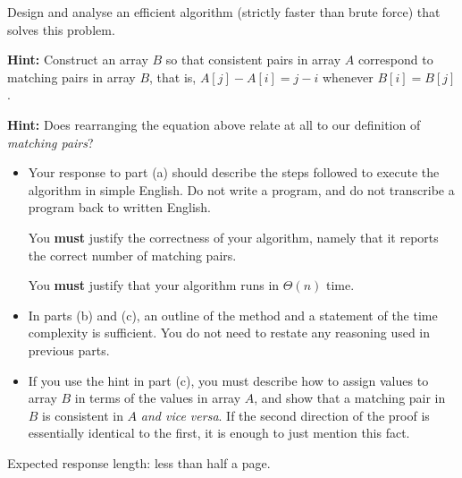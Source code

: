 \documentclass[12pt]{article}
\begin{document}
\begin{question}
\begin{enumerate}[label=(\alph*)]
    Design and analyse an efficient algorithm (strictly faster than brute force) that solves this problem.

    \textbf{Hint:} Construct an array \(B\) so that consistent pairs in array \(A\) correspond to matching pairs in array \(B\), that is, \(A[j] - A[i] = j - i\) whenever \(B[i] = B[j]\).

    \textbf{Hint:} Does rearranging the equation above relate at all to our definition of \emph{matching pairs}?

    
    \end{enumerate}
\end{question}

\begin{rubric}
\begin{itemize}
    \item Your response to part (a) should describe the steps followed to execute the algorithm in simple English. Do not write a program, and do not transcribe a program back to written English.

    You \textbf{must} justify the correctness of your algorithm, namely that it reports the correct number of matching pairs.
    
    You \textbf{must} justify that your algorithm runs in \(\Theta(n)\) time.

    \item In parts (b) and (c), an outline of the method and a statement of the time complexity is sufficient. You do not need to restate any reasoning used in previous parts.

    \item If you use the hint in part (c), you must describe how to assign values to array \(B\) in terms of the values in array \(A\), and show that a matching pair in \(B\) is consistent in \(A\) \emph{and vice versa}. If the second direction of the proof is essentially identical to the first, it is enough to just mention this fact.
\end{itemize}
Expected response length: less than half a page.
\end{rubric}

\begin{solution}
\end{solution}
\begin{attribution}
    
\end{attribution}
\end{document}
